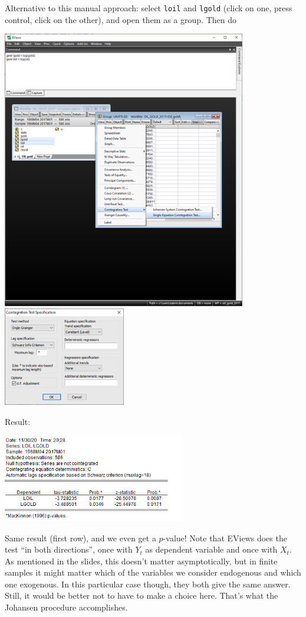 \documentclass[11pt, a4paper]{article}
\begin{document}
\begin{enumerate}
\begin{enumerate}
Alternative to this manual approach: select \texttt{loil} and \texttt{lgold} (click on one, press control, click on the other), and open them as a group. Then do
\begin{center}
\includegraphics[width=0.8\textwidth]{englegrangereviews}
\includegraphics[width=0.4\textwidth]{englegrangereviews2}
\end{center}
Result:
\begin{center}
\includegraphics[width=0.6\textwidth]{englegrangereviews3}
\end{center}
Same result (first row), and we even get a $p$-value! Note that EViews does the test ``in both directions'', once with $Y_t$ as dependent variable and once with $X_t$. As mentioned in the slides, this doesn’t matter asymptotically, but in finite samples it might matter which of the variables we consider endogenous and which one exogenous. In this particular case though, they both give the same answer. Still, it would be better not to have to make a choice here. That’s what the Johansen procedure accomplishes.



\end{enumerate}
\end{enumerate}
\end{document}
